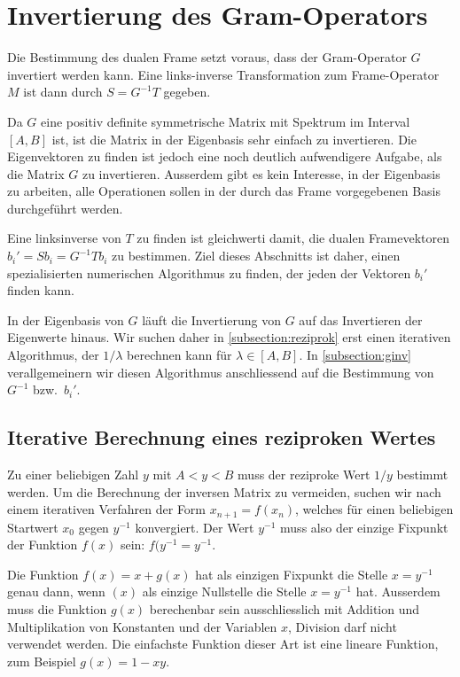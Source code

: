 %
%
%
\section{Invertierung des Gram-Operators\label{section:ginv}}
Die Bestimmung des dualen Frame setzt voraus, dass der Gram-Operator
$G$ invertiert werden kann.
Eine links-inverse Transformation zum Frame-Operator $M$ ist dann durch
$S=G^{-1}T$ gegeben.

Da $G$ eine positiv definite symmetrische Matrix mit Spektrum im
Interval $[A,B]$ ist, ist die Matrix in der Eigenbasis sehr einfach
zu invertieren.
Die Eigenvektoren zu finden ist jedoch eine noch deutlich aufwendigere
Aufgabe, als die Matrix $G$ zu invertieren.
Ausserdem gibt es kein Interesse, in der Eigenbasis zu arbeiten, alle
Operationen sollen in der durch das Frame vorgegebenen Basis durchgeführt
werden.

Eine linksinverse von $T$ zu finden ist gleichwerti damit,
die dualen Framevektoren $b_i' = Sb_i = G^{-1}Tb_i$ zu bestimmen.
Ziel dieses Abschnitts ist daher, einen spezialisierten numerischen
Algorithmus zu finden, der jeden der Vektoren $b_i'$ finden kann.

In der Eigenbasis von $G$ läuft die Invertierung von $G$ auf
das Invertieren der Eigenwerte hinaus.
Wir suchen daher in \ref{subsection:reziprok} erst einen iterativen
Algorithmus, der $1/\lambda$ berechnen kann für $\lambda\in[A,B]$.
In \ref{subsection:ginv} verallgemeinern wir diesen Algorithmus
anschliessend auf die Bestimmung von $G^{-1}$ bzw.~$b_i'$.

\subsection{Iterative Berechnung eines reziproken Wertes
\label{subsection:reziprok}}
Zu einer beliebigen Zahl $y$ mit $A < y < B$ muss der reziproke Wert $1/y$
bestimmt werden.
Um die Berechnung der inversen Matrix zu vermeiden, suchen wir nach einem
iterativen Verfahren der Form $x_{n+1}=f(x_n)$, welches für einen beliebigen
Startwert $x_0$ gegen $y^{-1}$ konvergiert.
Der Wert $y^{-1}$ muss also der einzige Fixpunkt der Funktion $f(x)$ sein:
$f(y^{-1}=y^{-1}$.

Die Funktion $f(x) = x + g(x)$ hat als einzigen Fixpunkt die Stelle $x=y^{-1}$
genau dann, wenn $(x)$ als einzige Nullstelle die Stelle $x=y^{-1}$ hat.
Ausserdem muss die Funktion $g(x)$ berechenbar sein ausschliesslich mit
Addition und Multiplikation von Konstanten und der Variablen $x$, Division
darf nicht verwendet werden.
Die einfachste Funktion dieser Art ist eine lineare Funktion, zum 
Beispiel $g(x) = 1- xy$.

